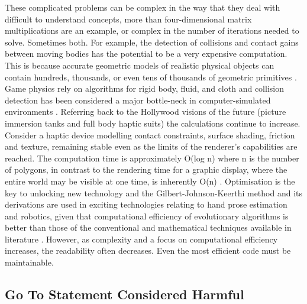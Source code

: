 \documentclass{scrartcl}
\begin{document}
These complicated problems can be complex in the way that they deal with difficult to understand concepts, more than four-dimensional matrix multiplications are an example, or complex in the number of iterations needed to solve. Sometimes both. For example, the detection of collisions and contact gains between moving bodies has the potential to be a very expensive computation. This is because accurate geometric models of realistic physical objects can contain hundreds, thousands, or even tens of thousands of geometric primitives \cite{featherstone2014rigid}. Game physics rely on algorithms for rigid body, fluid, and cloth \cite{seiler2008larrabee} and collision detection has been considered a major bottle-neck in computer-simulated environments \cite{cohen1995collide}. Referring back to the Hollywood visions of the future (picture immersion tanks and full body haptic suits) the calculations continue to increase. Consider a haptic device modelling contact constraints, surface shading, friction and texture, remaining stable even as the limits of the renderer’s capabilities are reached. The computation time is approximately O(log n) where n is the number of polygons, in contrast to the rendering time for a graphic display, where the entire world may be visible at one time, is inherently O(n) \cite{cohen1995collide}. Optimisation is the key to unlocking new technology and the Gilbert-Johnson-Keerthi method \cite{gilbert1988fast} and its derivations are used in exciting technologies relating to hand prose estimation \cite{krejov2015combining} and robotics, given that computational efficiency of evolutionary algorithms is better than those of the conventional and mathematical techniques available in literature \cite{saravanan2010evolutionary}. However, as complexity and a focus on computational efficiency increases, the readability often decreases. Even the most efficient code must be maintainable.

\subsection*{Go To Statement Considered Harmful \cite{dijkstra1968letters}}
\end{document}
